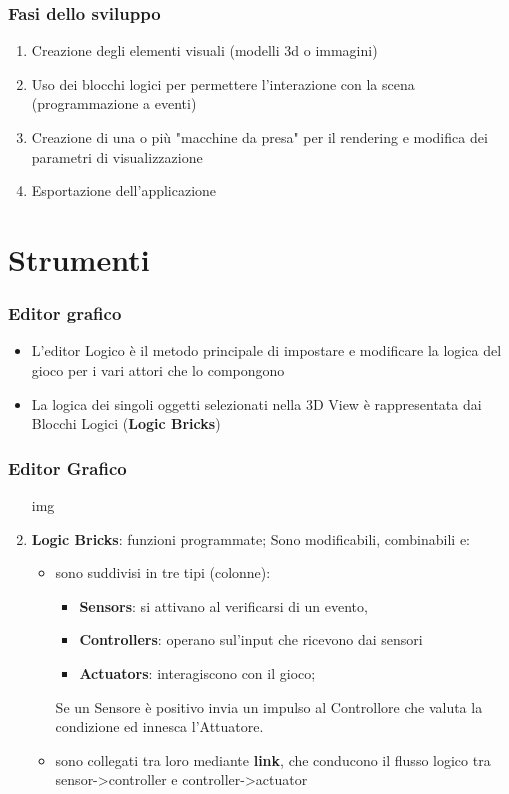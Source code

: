 \documentclass{beamer}
\begin{document}
		\begin{frame}
			\frametitle{Fasi dello sviluppo}
			\begin{enumerate}
				\item Creazione degli elementi visuali (modelli 3d o immagini)
				\item Uso dei blocchi logici per permettere l'interazione con la scena (programmazione a eventi)
				\item Creazione di una o più "macchine da presa" per il rendering e modifica dei parametri di visualizzazione
				\item Esportazione dell'applicazione
			\end{enumerate}
		\end{frame}
	
	\section{Strumenti}
		\begin{frame}
			\frametitle{Editor grafico}
			\begin{itemize}
				\item L'editor Logico è il metodo principale di impostare e modificare la logica del gioco per i vari attori che lo compongono
				\item La logica dei singoli oggetti selezionati nella 3D View è rappresentata dai Blocchi Logici (\textbf{Logic Bricks})
			\end{itemize}
		\end{frame}
		\begin{frame}
			\frametitle{Editor Grafico}
			\begin{enumerate}
			\item [img]
				\item \textbf{Logic Bricks}: funzioni programmate; Sono modificabili, combinabili e:
					\begin{itemize}
						\item sono suddivisi in tre tipi (colonne): 
						\begin{itemize}
							\item\textbf{Sensors}: \footnotesize si attivano al verificarsi di un evento, 
							\item \textbf{Controllers}: \footnotesize operano sul'input che ricevono dai sensori
							\item \textbf{Actuators}: \footnotesize interagiscono con il gioco;
						\end{itemize}
						Se un Sensore è positivo invia un impulso al Controllore che valuta la condizione ed innesca l’Attuatore.
						\item sono collegati tra loro mediante \textbf{link}, che conducono il flusso logico tra sensor->controller e controller->actuator
					\end{itemize}
			\end{enumerate}
		\end{frame}
\end{document}
